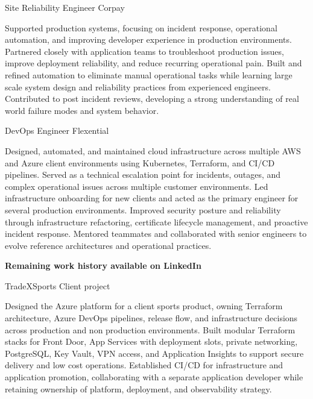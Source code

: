 \documentclass[a4paper]{ReadableCV}
\begin{document}
\bigskip

{Site Reliability Engineer}
{Corpay}

\roleAchievements
{Supported production systems, focusing on incident response, operational automation, and improving developer experience in production environments.}
{Partnered closely with application teams to troubleshoot production issues, improve deployment reliability, and reduce recurring operational pain.}
{Built and refined automation to eliminate manual operational tasks while learning large scale system design and reliability practices from experienced engineers.}
{Contributed to post incident reviews, developing a strong understanding of real world failure modes and system behavior.}
{}{}{}{}{}

\newpage
{DevOps Engineer}
{Flexential}

\roleAchievements
{Designed, automated, and maintained cloud infrastructure across multiple AWS and Azure client environments using Kubernetes, Terraform, and CI/CD pipelines.}
{Served as a technical escalation point for incidents, outages, and complex operational issues across multiple customer environments.}
{Led infrastructure onboarding for new clients and acted as the primary engineer for several production environments.}
{Improved security posture and reliability through infrastructure refactoring, certificate lifecycle management, and proactive incident response.}
{Mentored teammates and collaborated with senior engineers to evolve reference architectures and operational practices.}
{}{}{}{}

\medskip
\begin{center}
\textbf{Remaining work history available on LinkedIn}
\end{center}
\medskip


{TradeXSports}
{Client project}

\roleAchievements
{Designed the Azure platform for a client sports product, owning Terraform architecture, Azure DevOps pipelines, release flow, and infrastructure decisions across production and non production environments.}
{Built modular Terraform stacks for Front Door, App Services with deployment slots, private networking, PostgreSQL, Key Vault, VPN access, and Application Insights to support secure delivery and low cost operations.}
{Established CI/CD for infrastructure and application promotion, collaborating with a separate application developer while retaining ownership of platform, deployment, and observability strategy.}
{}{}{}{}{}{}
\end{document}
